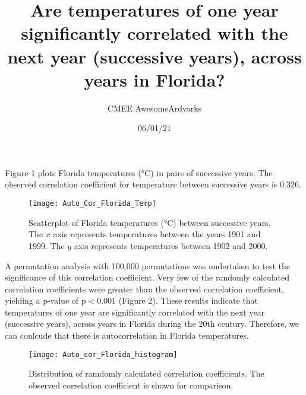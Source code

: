 \documentclass[11pt]{article}
\title{\vspace{-1.5cm}Are temperatures of one year significantly correlated with the next year (successive years), across years in Florida?} %
\author{CMEE AwesomeArdvarks}
\date{06/01/21}
\begin{document}
    \maketitle

    \noindent Figure 1 plots Florida temperatures (°C) in pairs of successive years. The observed correlation coefficient for temperature between successive years is 0.326. 

    \begin{figure}[h] %
        \centering %
        \texttt{[image: Auto\_Cor\_Florida\_Temp]} %
        \caption{Scatterplot of Florida temperatures (°C) between successive years. The \(x\) axis represents temperatures between the years 1901 and 1999. The \(y\) axis represents temperatures between 1902 and 2000.} %
    \end{figure}

    \noindent A permutation analysis with 100,000 permutations was undertaken to test the significance of this correlation coefficient. 
    Very few of the randomly calculated correlation coefficients were greater than the observed correlation coefficient, yielding a p-value of p\(<\)0.001 (Figure 2).
    These results indicate that temperatures of one year are significantly correlated with the next year (successive years), across years in Florida during the 20th century. Therefore, we can conlcude that there is autocorrelation in Florida temperatures. 

    \begin{figure}[h]
        \centering
        \texttt{[image: Auto\_cor\_Florida\_histogram]}
        \caption{Distribution of ramdomly calculated correlation coefficients. The observed correlation coefficient is shown for comparison.}
    \end{figure}
\end{document}
